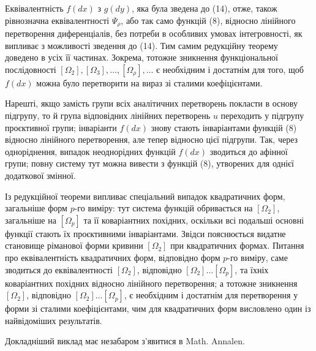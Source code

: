 \documentclass[11pt]{article}
\begin{document}
Еквівалентність \(f(dx)\) з \(g(dy)\), яка була зведена до (14), отже, також рівнозначна еквівалентності \(\Psi_\rho\), або так само функцій (8), відносно лінійного перетворення диференціалів, без потреби в особливих умовах інтегровності, як випливає з можливості зведення до (14). Тим самим редукційну теорему доведено в усіх її частинах. Зокрема, тотожне зникнення функціональної послідовності \([\Omega_2],[\Omega_3],\ldots,[\Omega_\rho],\ldots\) є необхідним і достатнім для того, щоб \(f(dx)\) можна було перетворити на вираз зі сталими коефіцієнтами.

Нарешті, якщо замість групи всіх аналітичних перетворень покласти в основу підгрупу, то й група відповідних лінійних перетворень \(u\) переходить у підгрупу проєктивної групи; інваріанти \(f(dx)\) знову стають інваріантами функцій (8) відносно лінійного перетворення, але тепер відносно цієї підгрупи. Так, через одноріднення, випадок неоднорідних функцій \(f(dx)\) зводиться до афінної групи; повну систему тут можна вивести з функцій (8), утворених для однієї додаткової змінної.

Із редукційної теореми випливає спеціальний випадок квадратичних форм, загальніше форм \(p\)-го виміру: тут система функцій обривається на \([\Omega_2]\), загальніше на \([\Omega_p]\) та її коваріантних похідних, оскільки всі подальші основні функції стають їх проєктивними інваріантами. Звідси пояснюється видатне становище ріманової форми кривини \([\Omega_2]\) при квадратичних формах. Питання про еквівалентність квадратичних форм, відповідно форм \(p\)-го виміру, саме зводиться до еквівалентності \([\Omega_2]\), відповідно \([\Omega_2]\ldots[\Omega_p]\), та їхніх коваріантних похідних відносно лінійного перетворення; а тотожне зникнення \([\Omega_2]\), відповідно \([\Omega_2]\ldots[\Omega_p]\), є необхідним і достатнім для перетворення у форми зі сталими коефіцієнтами, чим для квадратичних форм висловлено один із найвідоміших результатів.

Докладніший виклад має незабаром з'явитися в Math. Annalen.

\clearpage
\end{document}
